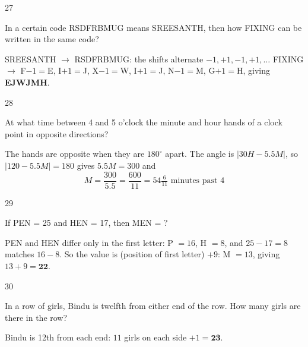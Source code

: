 \begin{question}{27}
{In a certain code RSDFRBMUG means SREESANTH, then how FIXING can be written in the same code?\par}
\begin{explain}
SREESANTH $\rightarrow$ RSDFRBMUG: the shifts alternate $-1, +1, -1, +1, \ldots$
FIXING $\rightarrow$ F$-1=$E, I$+1=$J, X$-1=$W, I$+1=$J, N$-1=$M, G$+1=$H, giving \textbf{EJWJMH}.
\end{explain}
\end{question}

\begin{question}{28}
{At what time between 4 and 5 o'clock the minute and hour hands of a clock point in opposite directions?\par}
\begin{explain}
The hands are opposite when they are $180^\circ$ apart. The angle is $|30H-5.5M|$, so $|120-5.5M|=180$ gives $5.5M=300$ and
\[M=\frac{300}{5.5}=\frac{600}{11}=54\tfrac{6}{11}\text{ minutes past 4}\]
\end{explain}
\end{question}

\begin{question}{29}
{If PEN = 25 and HEN = 17, then MEN = ?\par}
\begin{explain}
PEN and HEN differ only in the first letter: P $=16$, H $=8$, and $25-17=8$ matches $16-8$. So the value is (position of first letter) $+9$: M $=13$, giving $13+9=\mathbf{22}$.
\end{explain}
\end{question}

\begin{question}{30}
{In a row of girls, Bindu is twelfth from either end of the row. How many girls are there in the row?\par}
\begin{explain}
Bindu is 12th from each end: $11$ girls on each side $+1=\mathbf{23}$.
\end{explain}
\end{question}

